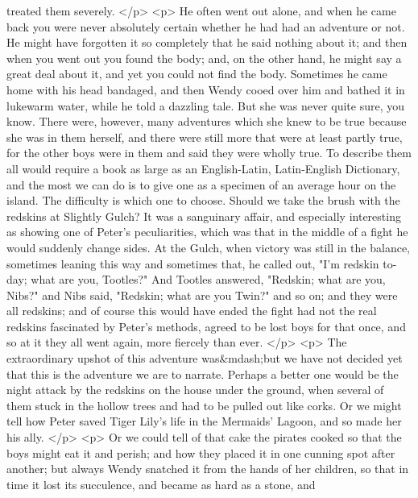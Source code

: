       treated them severely.
    </p>
    <p>
      He often went out alone, and when he came back you were never absolutely
      certain whether he had had an adventure or not. He might have forgotten it
      so completely that he said nothing about it; and then when you went out
      you found the body; and, on the other hand, he might say a great deal
      about it, and yet you could not find the body. Sometimes he came home with
      his head bandaged, and then Wendy cooed over him and bathed it in lukewarm
      water, while he told a dazzling tale. But she was never quite sure, you
      know. There were, however, many adventures which she knew to be true
      because she was in them herself, and there were still more that were at
      least partly true, for the other boys were in them and said they were
      wholly true. To describe them all would require a book as large as an
      English-Latin, Latin-English Dictionary, and the most we can do is to give
      one as a specimen of an average hour on the island. The difficulty is
      which one to choose. Should we take the brush with the redskins at
      Slightly Gulch? It was a sanguinary affair, and especially
      interesting as showing one of Peter's peculiarities, which was that in the
      middle of a fight he would suddenly change sides. At the Gulch, when
      victory was still in the balance, sometimes leaning this way and sometimes
      that, he called out, "I'm redskin to-day; what are you, Tootles?" And
      Tootles answered, "Redskin; what are you, Nibs?" and Nibs said, "Redskin;
      what are you Twin?" and so on; and they were all redskins; and of course
      this would have ended the fight had not the real redskins fascinated by
      Peter's methods, agreed to be lost boys for that once, and so at it they
      all went again, more fiercely than ever.
    </p>
    <p>
      The extraordinary upshot of this adventure was&mdash;but we have not
      decided yet that this is the adventure we are to narrate. Perhaps a better
      one would be the night attack by the redskins on the house under the
      ground, when several of them stuck in the hollow trees and had to be
      pulled out like corks. Or we might tell how Peter saved Tiger Lily's life
      in the Mermaids' Lagoon, and so made her his ally.
    </p>
    <p>
      Or we could tell of that cake the pirates cooked so that the boys might
      eat it and perish; and how they placed it in one cunning spot after
      another; but always Wendy snatched it from the hands of her children, so
      that in time it lost its succulence, and became as hard as a stone, and
